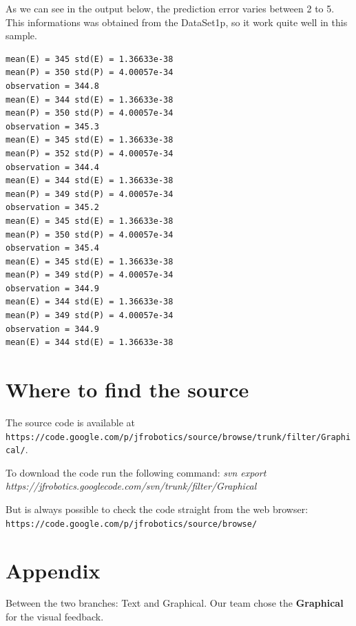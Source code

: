 \documentclass{article}
\begin{document}
As we can see in the output below, the prediction error varies between 2 to 5. This informations was obtained from the DataSet1p, so it work quite well in this sample.

\begin{lstlisting}
mean(E) = 345 std(E) = 1.36633e-38
mean(P) = 350 std(P) = 4.00057e-34
observation = 344.8
mean(E) = 344 std(E) = 1.36633e-38
mean(P) = 350 std(P) = 4.00057e-34
observation = 345.3
mean(E) = 345 std(E) = 1.36633e-38
mean(P) = 352 std(P) = 4.00057e-34
observation = 344.4
mean(E) = 344 std(E) = 1.36633e-38
mean(P) = 349 std(P) = 4.00057e-34
observation = 345.2
mean(E) = 345 std(E) = 1.36633e-38
mean(P) = 350 std(P) = 4.00057e-34
observation = 345.4
mean(E) = 345 std(E) = 1.36633e-38
mean(P) = 349 std(P) = 4.00057e-34
observation = 344.9
mean(E) = 344 std(E) = 1.36633e-38
mean(P) = 349 std(P) = 4.00057e-34
observation = 344.9
mean(E) = 344 std(E) = 1.36633e-38
\end{lstlisting}

\section{Where to find the source}

The source code is available at \texttt{https://code.google.com/p/jfrobotics/source/browse/trunk/filter/Graphical/}.

To download the code run the following command:
\textit{svn export https://jfrobotics.googlecode.com/svn/trunk/filter/Graphical}

But is always possible to check the code straight from the web browser:
\texttt{https://code.google.com/p/jfrobotics/source/browse/}

\section{Appendix}

Between the two branches: Text and Graphical. Our team chose the \textbf{Graphical} for the visual feedback.
\end{document}

